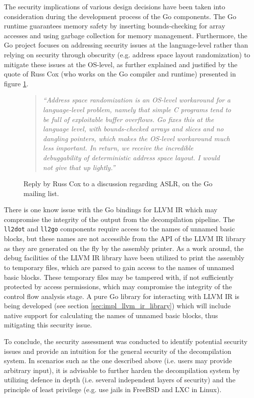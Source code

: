 The security implications of various design decisions have been taken into consideration during the development process of the Go components. The Go runtime guarantees memory safety by inserting bounds-checking for array accesses and using garbage collection for memory management. Furthermore, the Go project focuses on addressing security issues at the language-level rather than relying on security through obscurity (e.g. address space layout randomization) to mitigate these issues at the OS-level, as further explained and justified by the quote of Russ Cox (who works on the Go compiler and runtime) presented in figure \ref{fig:no_aslr}.

\begin{figure}[htbp]
	\begin{quote}
		\textit{``Address space randomization is an OS-level workaround for a language-level problem, namely that simple C programs tend to be full of exploitable buffer overflows.  Go fixes this at the language level, with bounds-checked arrays and slices and no dangling pointers, which makes the OS-level workaround much less important.  In return, we receive the incredible debuggability of deterministic address space layout.  I would not give that up lightly.''}
	\end{quote}
	\caption{Reply by Russ Cox to a discussion regarding ASLR, on the Go mailing list\protect\footnotemark.}
	\label{fig:no_aslr}
\end{figure}

There is one know issue with the Go bindings for LLVM IR which may compromise the integrity of the output from the decompilation pipeline. The \texttt{ll2dot} and \texttt{ll2go} components require access to the names of unnamed basic blocks, but these names are not accessible from the API of the LLVM IR library as they are generated on the fly by the assembly printer. As a work around, the debug facilities of the LLVM IR library have been utilized to print the assembly to temporary files, which are parsed to gain access to the names of unnamed basic blocks. These temporary files may be tampered with, if not sufficiently protected by access permissions, which may compromise the integrity of the control flow analysis stage. A pure Go library for interacting with LLVM IR is being developed (see section \ref{sec:impl_llvm_ir_library}) which will include native support for calculating the names of unnamed basic blocks, thus mitigating this security issue.

To conclude, the security assessment was conducted to identify potential security issues and provide an intuition for the general security of the decompilation system. In scenarios such as the one described above (i.e. users may provide arbitrary input), it is advisable to further harden the decompilation system by utilizing defence in depth (i.e. several independent layers of security) and the principle of least privilege (e.g. use jails in FreeBSD and LXC in Linux).
